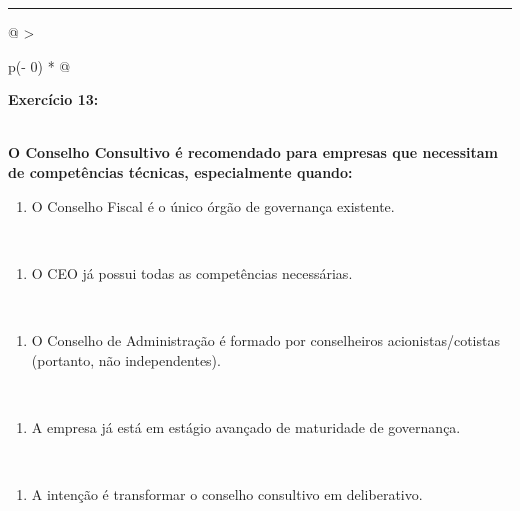 \documentclass[
]{book}
\providecommand{\tightlist}{%
  \setlength{\itemsep}{0pt}\setlength{\parskip}{0pt}}
\begin{document}
\begin{center}\rule{0.5\linewidth}{0.5pt}\end{center}

\begin{longtable}[]{@{}
  >{\raggedright\arraybackslash}p{(\columnwidth - 0\tabcolsep) * }@{}}
\toprule\noalign{}
\begin{minipage}[b]{\linewidth}\raggedright
\textbf{Exercício 13:}
\end{minipage} \\
\midrule\noalign{}
\endhead
\bottomrule\noalign{}
\endlastfoot
\textbf{O Conselho Consultivo é recomendado para empresas que necessitam de competências técnicas, especialmente quando:} \\
\begin{minipage}[t]{\linewidth}\raggedright
\begin{enumerate}
\def\labelenumi{\alph{enumi})}
\tightlist
\item
  O Conselho Fiscal é o único órgão de governança existente.
\end{enumerate}
\end{minipage} \\
\begin{minipage}[t]{\linewidth}\raggedright
\begin{enumerate}
\def\labelenumi{\alph{enumi})}
\setcounter{enumi}{1}
\tightlist
\item
  O CEO já possui todas as competências necessárias.
\end{enumerate}
\end{minipage} \\
\begin{minipage}[t]{\linewidth}\raggedright
\begin{enumerate}
\def\labelenumi{\alph{enumi})}
\setcounter{enumi}{2}
\tightlist
\item
  O Conselho de Administração é formado por conselheiros acionistas/cotistas (portanto, não independentes).
\end{enumerate}
\end{minipage} \\
\begin{minipage}[t]{\linewidth}\raggedright
\begin{enumerate}
\def\labelenumi{\alph{enumi})}
\setcounter{enumi}{3}
\tightlist
\item
  A empresa já está em estágio avançado de maturidade de governança.
\end{enumerate}
\end{minipage} \\
\begin{minipage}[t]{\linewidth}\raggedright
\begin{enumerate}
\def\labelenumi{\alph{enumi})}
\setcounter{enumi}{4}
\tightlist
\item
  A intenção é transformar o conselho consultivo em deliberativo.
\end{enumerate}
\end{minipage} \\
\end{longtable}
\end{document}
